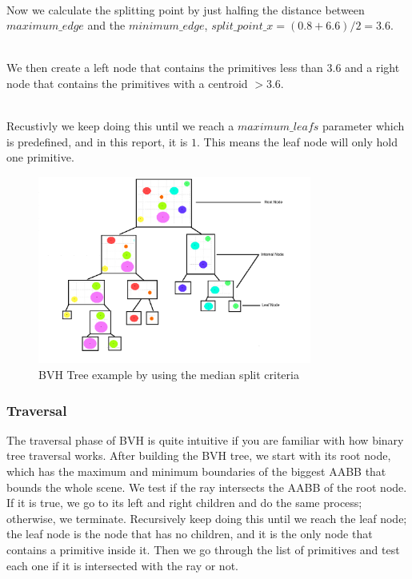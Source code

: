 \documentclass[11pt,a4paper]{article}
\begin{document}
\noindent
\\
Now we calculate the splitting point by just halfing the distance between $maximum\_edge $ and the $minimum\_edge$, $split\_point\_x = (0.8+6.6) / 2 = 3.6$.

\noindent
\\
We then create a left node that contains the primitives less than 3.6 and a right node that contains the primitives with a centroid $ > 3.6$. 

\noindent
\\
Recustivly we keep doing this until we reach a $maximum\_leafs$ parameter which is predefined, and in this report, it is $1$. This means the leaf node will only hold one primitive. 


\begin{figure}[h]	
     \centering
     \captionsetup{justification=centering,margin=2cm}
     \includegraphics[width=9cm]{images/example_bvh/tree.png}
     \caption{BVH Tree example by using the median split criteria}
     \label{fig:dice}
\end{figure}
\clearpage


\subsubsection{Traversal}
 The traversal phase of BVH is quite intuitive if you are familiar with how binary tree traversal works. After building the BVH tree, we start with its root node, which has the maximum and minimum boundaries of the biggest AABB that bounds the whole scene. We test if the ray intersects the AABB of the root node. If it is true, we go to its left and right children and do the same process; otherwise, we terminate. Recursively keep doing this until we reach the leaf node; the leaf node is the node that has no children, and it is the only node that contains a primitive inside it. Then we go through the list of primitives and test each one if it is intersected with the ray or not. 
\end{document}
